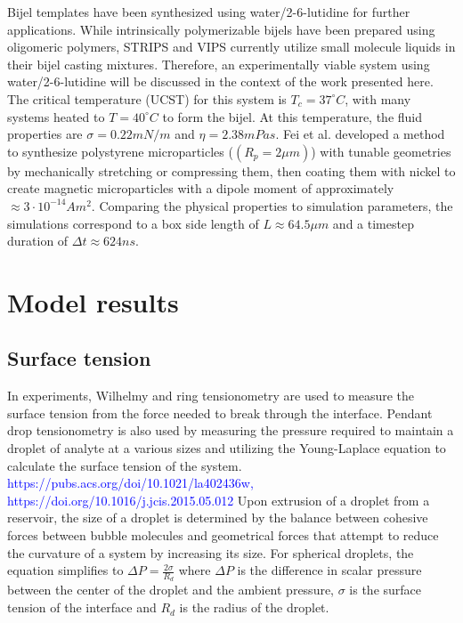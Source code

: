 Bijel templates have been synthesized using water/2-6-lutidine for further applications. \cite{lee_making_2013} 
While intrinsically polymerizable bijels have been prepared using oligomeric polymers, STRIPS and VIPS currently 
utilize small molecule liquids in their bijel casting mixtures. Therefore, an experimentally viable system using 
water/2-6-lutidine will be discussed in the context of the work presented here. The critical temperature (UCST) 
for this system is $T_c = 37 ^{\circ}C$, with many systems heated to $T = 40^{\circ}C$ to form the bijel. At this 
temperature, the fluid properties are $\sigma = 0.22 mN/m$ and $\eta = 2.38 mPas$. \cite{grattoni_lower_1993} 
Fei et al. developed a method to synthesize polystyrene microparticles ($(R_p = 2 \mu m)$) with tunable geometries 
by mechanically stretching or compressing them, then coating them with nickel to create magnetic microparticles with 
a dipole moment of approximately$\approx 3 \cdot 10^{-14} Am^2$. \cite{fei_active_2017, fei_magneto-capillary_2020} 
Comparing the physical properties to simulation parameters, the simulations correspond to a box side length of 
$L \approx 64.5 \mu m$ and a timestep duration of $\Delta t \approx 624 ns$. 

\section{Model results}
\label{section:model_results}

\subsection{Surface tension}
\label{section:model_surface_tension}

In experiments, Wilhelmy and ring tensionometry are used to measure the surface tension from the force needed 
to break through the interface. Pendant drop tensionometry is also used by measuring the pressure required to 
maintain a droplet of analyte at a various sizes and utilizing the Young-Laplace equation to calculate the 
surface tension of the system. 
\textcolor{blue}{https://pubs.acs.org/doi/10.1021/la402436w, https://doi.org/10.1016/j.jcis.2015.05.012} 
Upon extrusion of a droplet from a reservoir, the size of a droplet is determined by the balance between 
cohesive forces between bubble molecules and geometrical forces that attempt to reduce the curvature of a 
system by increasing its size. For spherical droplets, the equation simplifies to 
$\Delta P = \frac{2 \sigma}{R_d}$ where $\Delta P$ is the difference in scalar pressure 
between the center of the droplet and the ambient pressure, $\sigma$ is the surface tension 
of the interface and $R_d$ is the radius of the droplet. 

